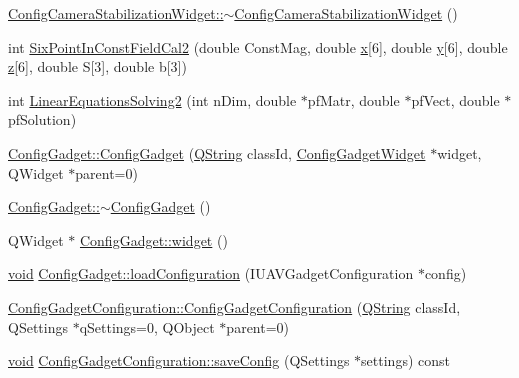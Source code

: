 \begin{DoxyCompactItemize}
\item 
\hyperlink{group___config_plugin_ga6294d4eae582574215951c5213ae4e0b}{\-Config\-Camera\-Stabilization\-Widget\-::$\sim$\-Config\-Camera\-Stabilization\-Widget} ()
\item 
int \hyperlink{group___config_plugin_ga6ed065f6a9a58eb96dab22485bcf48ee}{\-Six\-Point\-In\-Const\-Field\-Cal2} (double \-Const\-Mag, double \hyperlink{_o_p_plots_8m_a9336ebf25087d91c818ee6e9ec29f8c1}{x}\mbox{[}6\mbox{]}, double \hyperlink{_o_p_plots_8m_a2fb1c5cf58867b5bbc9a1b145a86f3a0}{y}\mbox{[}6\mbox{]}, double \hyperlink{_o_p_plots_8m_a25ed1bcb423b0b7200f485fc5ff71c8e}{z}\mbox{[}6\mbox{]}, double \-S\mbox{[}3\mbox{]}, double b\mbox{[}3\mbox{]})
\item 
int \hyperlink{group___config_plugin_gae36fbabaf3892d933d17f670d77cb208}{\-Linear\-Equations\-Solving2} (int n\-Dim, double $\ast$pf\-Matr, double $\ast$pf\-Vect, double $\ast$pf\-Solution)
\item 
\hyperlink{group___config_plugin_gae5427c3bad5fe19de2f24710fd629d87}{\-Config\-Gadget\-::\-Config\-Gadget} (\hyperlink{group___u_a_v_objects_plugin_gab9d252f49c333c94a72f97ce3105a32d}{\-Q\-String} class\-Id, \hyperlink{class_config_gadget_widget}{\-Config\-Gadget\-Widget} $\ast$widget, \-Q\-Widget $\ast$parent=0)
\item 
\hyperlink{group___config_plugin_ga6fbabaaacad7e51739c18053d5aa83fd}{\-Config\-Gadget\-::$\sim$\-Config\-Gadget} ()
\item 
\-Q\-Widget $\ast$ \hyperlink{group___config_plugin_ga678f4bf881dd4095ab62f66d69c32546}{\-Config\-Gadget\-::widget} ()
\item 
\hyperlink{group___u_a_v_objects_plugin_ga444cf2ff3f0ecbe028adce838d373f5c}{void} \hyperlink{group___config_plugin_ga43acf4e389daaf28085a3773b4abc903}{\-Config\-Gadget\-::load\-Configuration} (\-I\-U\-A\-V\-Gadget\-Configuration $\ast$config)
\item 
\hyperlink{group___config_plugin_ga60e6c6cfd7819f53b6a76447ba34d774}{\-Config\-Gadget\-Configuration\-::\-Config\-Gadget\-Configuration} (\hyperlink{group___u_a_v_objects_plugin_gab9d252f49c333c94a72f97ce3105a32d}{\-Q\-String} class\-Id, \-Q\-Settings $\ast$q\-Settings=0, \-Q\-Object $\ast$parent=0)
\item 
\hyperlink{group___u_a_v_objects_plugin_ga444cf2ff3f0ecbe028adce838d373f5c}{void} \hyperlink{group___config_plugin_ga6b1f86f80d200736d29b69452e329040}{\-Config\-Gadget\-Configuration\-::save\-Config} (\-Q\-Settings $\ast$settings) const 
\item 

\end{DoxyCompactItemize}
